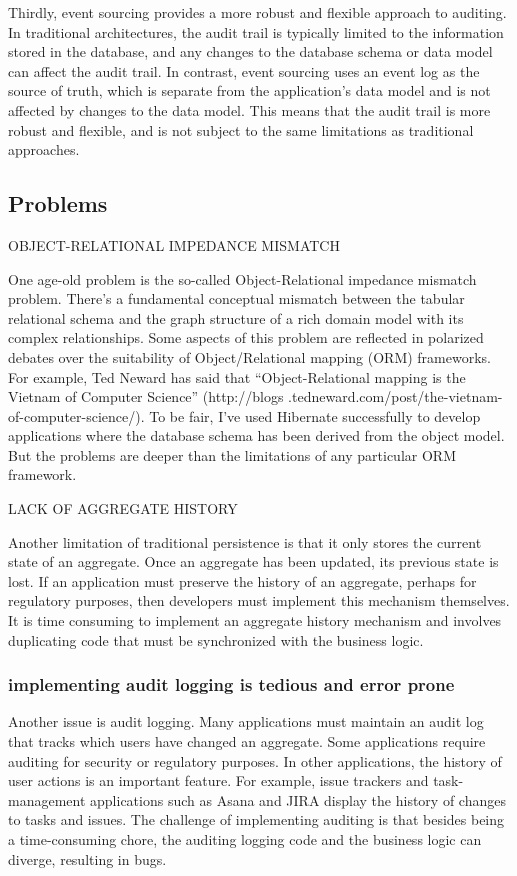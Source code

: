 Thirdly, event sourcing provides a more robust and flexible approach to auditing. In traditional architectures, the audit trail is typically limited to the information stored in the database, and any changes to the database schema or data model can affect the audit trail. In contrast, event sourcing uses an event log as the source of truth, which is separate from the application's data model and is not affected by changes to the data model. This means that the audit trail is more robust and flexible, and is not subject to the same limitations as traditional approaches.

\subsection{Problems}

OBJECT-RELATIONAL IMPEDANCE MISMATCH

One age-old problem is the so-called Object-Relational impedance mismatch problem.
There’s a fundamental conceptual mismatch between the tabular relational schema
and the graph structure of a rich domain model with its complex relationships.
Some aspects of this problem are reflected in polarized debates over the suitability of
Object/Relational mapping (ORM) frameworks. For example, Ted Neward has said
that “Object-Relational mapping is the Vietnam of Computer Science” (http://blogs
.tedneward.com/post/the-vietnam-of-computer-science/). To be fair, I’ve used
Hibernate successfully to develop applications where the database schema has been
derived from the object model. But the problems are deeper than the limitations of
any particular ORM framework. 

LACK OF AGGREGATE HISTORY

Another limitation of traditional persistence is that it only stores the current state of
an aggregate. Once an aggregate has been updated, its previous state is lost. If an
application must preserve the history of an aggregate, perhaps for regulatory purposes, then developers must implement this mechanism themselves. It is time consuming to implement an aggregate history mechanism and involves duplicating code
that must be synchronized with the business logic.

\subsubsection{implementing audit logging is tedious and error prone}

Another issue is audit logging. Many applications must maintain an audit log that
tracks which users have changed an aggregate. Some applications require auditing for
security or regulatory purposes. In other applications, the history of user actions is an
important feature. For example, issue trackers and task-management applications
such as Asana and JIRA display the history of changes to tasks and issues. The challenge of implementing auditing is that besides being a time-consuming chore, the
auditing logging code and the business logic can diverge, resulting in bugs.

